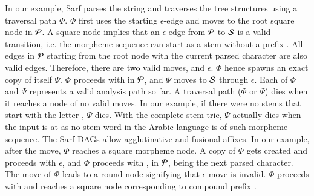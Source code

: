 In our example, Sarf parses the string 
and traverses the tree structures using a traversal path $\Phi$. 
$\Phi$ first uses the starting $\epsilon$-edge and moves to the root square node in ${\cal P}$. 
A square node implies that an $\epsilon$-edge from ${\cal P}$ to ${\cal S}$ is a valid transition, i.e. the morpheme sequence can start as a stem without a prefix . All edges in ${\cal P}$ starting from the root node with the current parsed character 
 are also valid edges. 
Therefore, there are two valid moves,  and $\epsilon$.  
$\Phi$ hence spawns an exact copy of itself $\Psi$. 
$\Phi$ proceeds with  in ${\cal P}$, and $\Psi$ moves to ${\cal S}$ through $\epsilon$. 
Each of $\Phi$ and $\Psi$ represents a valid analysis path so far. 
A traversal path ($\Phi$ or $\Psi$) dies when it reaches a node of no valid moves.
In our example, if there were no stems that start 
with the letter , $\Psi$ dies. 
With the complete stem trie, $\Psi$ actually dies when the input 
is at  as no stem word in the Arabic language is of such morpheme sequence. 
%
The Sarf DAGs allow agglutinative and fusional affixes. 
In our example, after the  move, $\Phi$ reaches a square morpheme node. A copy of $\Phi$ gets created and proceeds with $\epsilon$, and $\Phi$ proceeds with , in ${\cal P}$, being the next parsed character.
The move of $\Phi$ leads to a round node signifying that $\epsilon$ move is invalid. $\Phi$ proceeds with  and reaches a square node corresponding to compound prefix .


